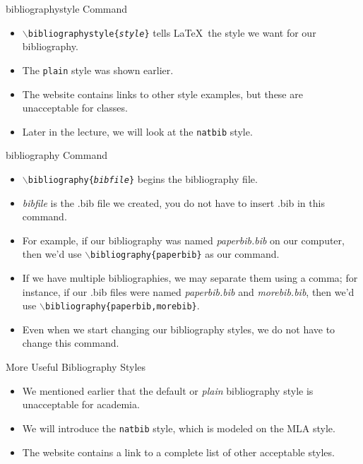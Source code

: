 \documentclass[pdf]{prosper}
\begin{document}
\begin{slide}{bibliographystyle Command}
	\begin{itemize}
		\item \texttt{$\backslash$bibliographystyle\{\textit{style}\}} tells \LaTeX\ the style we want for our bibliography.
		\item The \texttt{plain} style was shown earlier.
		\item The website contains links to other style examples, but these are unacceptable for classes.
		\item Later in the lecture, we will look at the \texttt{natbib} style.
	\end{itemize}
\end{slide}
\begin{slide}{bibliography Command}
	\begin{itemize}
		\item \texttt{$\backslash$bibliography\{\textit{bibfile}\}} begins the bibliography file.
		\item \textit{bibfile} is the .bib file we created, you do not have to insert .bib in this command.
		\item For example, if our bibliography was named \textit{paperbib.bib} on our computer, then we'd use \texttt{$\backslash$bibliography\{paperbib\}} as our command.
		\item If we have multiple bibliographies, we may separate them using a comma; for instance, if our .bib files were named \textit{paperbib.bib} and \textit{morebib.bib}, then we'd use \texttt{$\backslash$bibliography\{paperbib,morebib\}}.
		\item Even when we start changing our bibliography styles, we do not have to change this command.
	\end{itemize}
\end{slide}
\begin{slide}{More Useful Bibliography Styles}
	\begin{itemize}
		\item We mentioned earlier that the default or \textit{plain} bibliography style is unacceptable for academia.
		\item We will introduce the \texttt{natbib} style, which is modeled on the MLA style.
		\item The website contains a link to a complete list of other acceptable styles. %
	\end{itemize}
\end{slide}
\end{document}
